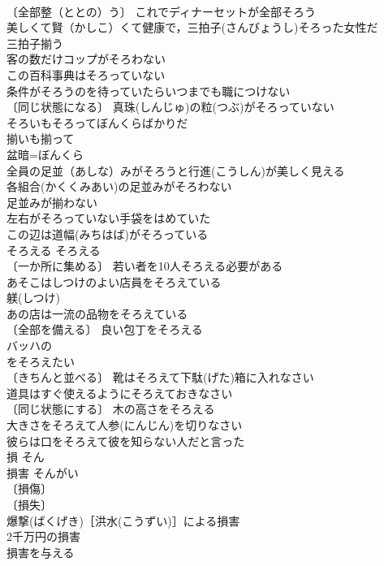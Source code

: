 \documentclass[8pt]{extreport}
\begin{document}
\begin{CJK}{UTF8}{min}
\\	〔全部整（ととの）う〕 これでディナーセットが全部そろう 
\\	美しくて賢（かしこ）くて健康で，三拍子(さんびょうし)そろった女性だ 
\\	三拍子揃う　
\\	客の数だけコップがそろわない 
\\	この百科事典はそろっていない 
\\	条件がそろうのを待っていたらいつまでも職につけない 
\\	〔同じ状態になる〕 真珠(しんじゅ)の粒(つぶ)がそろっていない 
\\	そろいもそろってぼんくらばかりだ 
\\	揃いも揃って　
\\	盆暗=ぼんくら　
\\	全員の足並（あしな）みがそろうと行進(こうしん)が美しく見える 
\\	各組合(かくくみあい)の足並みがそろわない 
\\	足並みが揃わない　
\\	左右がそろっていない手袋をはめていた 
\\	この辺は道幅(みちはば)がそろっている 
\\	そろえる	そろえる	
\\	〔一か所に集める〕 若い者を10人そろえる必要がある 
\\	あそこはしつけのよい店員をそろえている 
\\	躾(しつけ)　
\\	あの店は一流の品物をそろえている 
\\	〔全部を備える〕 良い包丁をそろえる 
\\	バッハの
\\	をそろえたい 
\\	〔きちんと並べる〕 靴はそろえて下駄(げた)箱に入れなさい 
\\	道具はすぐ使えるようにそろえておきなさい 
\\	〔同じ状態にする〕 木の高さをそろえる 
\\	大きさをそろえて人参(にんじん)を切りなさい 
\\	彼らは口をそろえて彼を知らない人だと言った 
\\	損	そん	
\\	損害	そんがい	
\\	〔損傷〕
\\	〔損失〕
\\	爆撃(ばくげき)［洪水(こうずい)］による損害 
\\	2千万円の損害 
\\	損害を与える 

\end{CJK}
\end{document}
